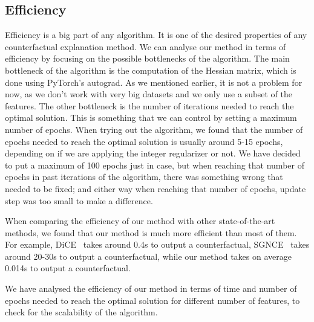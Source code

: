 \documentclass[12pt]{extarticle}
\numberwithin{equation}{section}
\begin{document}
\subsection{Efficiency}\label{sec:efficiency}
Efficiency is a big part of any algorithm. It is one of the desired properties of any counterfactual explanation method. We can analyse our method in terms of efficiency by focusing on the possible bottlenecks of the algorithm. The main bottleneck of the algorithm is the computation of the Hessian matrix, which is done using PyTorch's autograd. As we mentioned earlier, it is not a problem for now, as we don't work with very big datasets and we only use a subset of the features. The other bottleneck is the number of iterations needed to reach the optimal solution. This is something that we can control by setting a maximum number of epochs. When trying out the algorithm, we found that the number of epochs needed to reach the optimal solution is usually around 5-15 epochs, depending on if we are applying the integer regularizer or not. We have decided to put a maximum of 100 epochs just in case, but when reaching that number of epochs in past iterations of the algorithm, there was something wrong that needed to be fixed; and either way when reaching that number of epochs, update step was too small to make a difference.

When comparing the efficiency of our method with other state-of-the-art methods, we found that our method is much more efficient than most of them. For example, DiCE~\cite{dice} takes around 0.4s to output a counterfactual, SGNCE~\cite{sgnce} takes around 20-30s to output a counterfactual, while our method takes on average 0.014s to output a counterfactual. 

We have analysed the efficiency of our method in terms of time and number of epochs needed to reach the optimal solution for different number of features, to check for the scalability of the algorithm.
\end{document}
